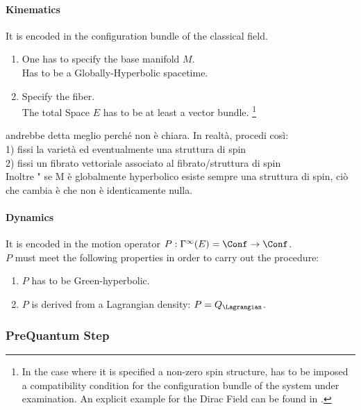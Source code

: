 \documentclass[Main]{subfiles}
\begin{document}
		\paragraph{Kinematics}
		It is encoded in the configuration bundle of the classical field.
   					\begin{enumerate}
   						\item One has to specify the base manifold $M$. \\Has to be a Globally-Hyperbolic spacetime.
   						\item\label{Step:AuxiliaryStructure} Specify the fiber.\\ The total Space $E$ has to be at least a vector bundle.
   							\footnote{	In the case where it is specified a non-zero spin structure,
   							has to be imposed a compatibility condition for the configuration bundle of the system under examination.
   							An explicit example for the Dirac Field can be found in \cite{Dappiaggi2013}.}
   					\end{enumerate}
\ifToninus
   						\begin{Warning}
   							andrebbe detta meglio perché non è chiara. In realtà, procedi così:\\
   							1) fissi la varietà ed eventualmente una struttura di spin \\
   							2) fissi un fibrato vettoriale associato al fibrato/struttura di spin\\
   							Inoltre " se M è globalmente hyperbolico esiste sempre una struttura di spin, ciò che  cambia è che non è identicamente nulla.
   						\end{Warning}
\fi


   		\paragraph{Dynamics}
		It is encoded in the motion operator $P: \Gamma^\infty (E)= \Conf \rightarrow \Conf$.\\
   		$P$ must meet the following properties in order to carry out the procedure:
   				   	\begin{enumerate}
   						\item $P$ has to be Green-hyperbolic.%
   						\item $P$ is derived from a Lagrangian density: $P=Q_\Lagrangian$.%
   					\end{enumerate}

	\subsubsection{PreQuantum Step}%
\end{document}
